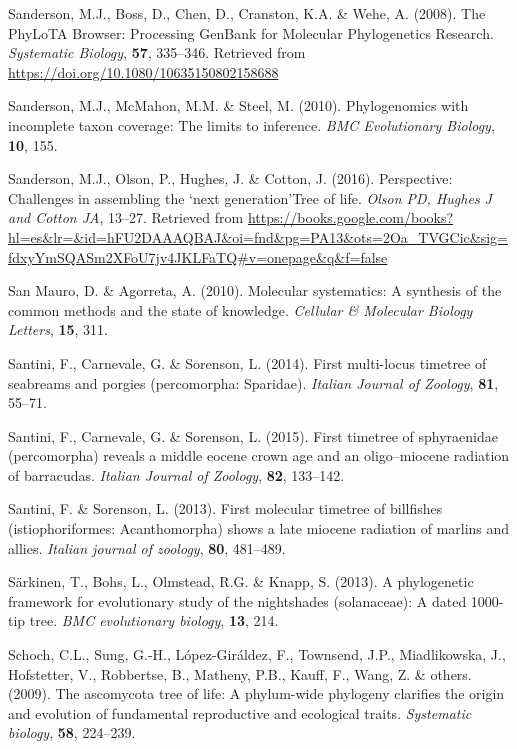 \documentclass[]{article}
\begin{document}
\leavevmode\hypertarget{ref-sanderson2008phylota}{}%
Sanderson, M.J., Boss, D., Chen, D., Cranston, K.A. \& Wehe, A. (2008). The PhyLoTA Browser: Processing GenBank for Molecular Phylogenetics Research. \emph{Systematic Biology}, \textbf{57}, 335--346. Retrieved from \url{https://doi.org/10.1080/10635150802158688}

\leavevmode\hypertarget{ref-sanderson2010phylogenomics}{}%
Sanderson, M.J., McMahon, M.M. \& Steel, M. (2010). Phylogenomics with incomplete taxon coverage: The limits to inference. \emph{BMC Evolutionary Biology}, \textbf{10}, 155.

\leavevmode\hypertarget{ref-sanderson2016perspective}{}%
Sanderson, M.J., Olson, P., Hughes, J. \& Cotton, J. (2016). Perspective: Challenges in assembling the `next generation'Tree of life. \emph{Olson PD, Hughes J and Cotton JA}, 13--27. Retrieved from \url{https://books.google.com/books?hl=es\&lr=\&id=hFU2DAAAQBAJ\&oi=fnd\&pg=PA13\&ots=2Oa_TVGCic\&sig=fdxyYmSQASm2XFoU7jv4JKLFaTQ\#v=onepage\&q\&f=false}

\leavevmode\hypertarget{ref-san2010molecular}{}%
San Mauro, D. \& Agorreta, A. (2010). Molecular systematics: A synthesis of the common methods and the state of knowledge. \emph{Cellular \& Molecular Biology Letters}, \textbf{15}, 311.

\leavevmode\hypertarget{ref-santini2014first}{}%
Santini, F., Carnevale, G. \& Sorenson, L. (2014). First multi-locus timetree of seabreams and porgies (percomorpha: Sparidae). \emph{Italian Journal of Zoology}, \textbf{81}, 55--71.

\leavevmode\hypertarget{ref-santini2015first}{}%
Santini, F., Carnevale, G. \& Sorenson, L. (2015). First timetree of sphyraenidae (percomorpha) reveals a middle eocene crown age and an oligo--miocene radiation of barracudas. \emph{Italian Journal of Zoology}, \textbf{82}, 133--142.

\leavevmode\hypertarget{ref-santini2013first}{}%
Santini, F. \& Sorenson, L. (2013). First molecular timetree of billfishes (istiophoriformes: Acanthomorpha) shows a late miocene radiation of marlins and allies. \emph{Italian journal of zoology}, \textbf{80}, 481--489.

\leavevmode\hypertarget{ref-sarkinen2013solanaceae}{}%
Särkinen, T., Bohs, L., Olmstead, R.G. \& Knapp, S. (2013). A phylogenetic framework for evolutionary study of the nightshades (solanaceae): A dated 1000-tip tree. \emph{BMC evolutionary biology}, \textbf{13}, 214.

\leavevmode\hypertarget{ref-schoch2009ascomycota}{}%
Schoch, C.L., Sung, G.-H., López-Giráldez, F., Townsend, J.P., Miadlikowska, J., Hofstetter, V., Robbertse, B., Matheny, P.B., Kauff, F., Wang, Z. \& others. (2009). The ascomycota tree of life: A phylum-wide phylogeny clarifies the origin and evolution of fundamental reproductive and ecological traits. \emph{Systematic biology}, \textbf{58}, 224--239.
\end{document}
